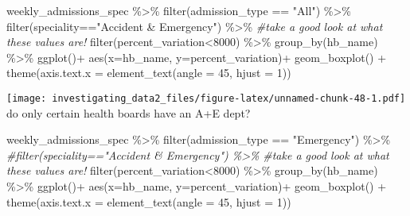 \documentclass[
]{article}
\newenvironment{Shaded}{\begin{snugshade}}{\end{snugshade}}
\newcommand{\AttributeTok}[1]{\textcolor[rgb]{0.77,0.63,0.00}{#1}}
\newcommand{\CommentTok}[1]{\textcolor[rgb]{0.56,0.35,0.01}{\textit{#1}}}
\newcommand{\DecValTok}[1]{\textcolor[rgb]{0.00,0.00,0.81}{#1}}
\newcommand{\FunctionTok}[1]{\textcolor[rgb]{0.00,0.00,0.00}{#1}}
\newcommand{\NormalTok}[1]{#1}
\newcommand{\SpecialCharTok}[1]{\textcolor[rgb]{0.00,0.00,0.00}{#1}}
\newcommand{\StringTok}[1]{\textcolor[rgb]{0.31,0.60,0.02}{#1}}
\begin{document}
\begin{Shaded}
\begin{Highlighting}[]
\NormalTok{weekly\_admissions\_spec }\SpecialCharTok{\%\textgreater{}\%} 
  \FunctionTok{filter}\NormalTok{(admission\_type }\SpecialCharTok{==} \StringTok{"All"}\NormalTok{) }\SpecialCharTok{\%\textgreater{}\%} 
  \FunctionTok{filter}\NormalTok{(speciality}\SpecialCharTok{==}\StringTok{"Accident \& Emergency"}\NormalTok{) }\SpecialCharTok{\%\textgreater{}\%} 
  \CommentTok{\#take a good look at what these values are!}
  \FunctionTok{filter}\NormalTok{(percent\_variation}\SpecialCharTok{\textless{}}\DecValTok{8000}\NormalTok{) }\SpecialCharTok{\%\textgreater{}\%} 
  \FunctionTok{group\_by}\NormalTok{(hb\_name) }\SpecialCharTok{\%\textgreater{}\%} 
  \FunctionTok{ggplot}\NormalTok{()}\SpecialCharTok{+}
  \FunctionTok{aes}\NormalTok{(}\AttributeTok{x=}\NormalTok{hb\_name, }\AttributeTok{y=}\NormalTok{percent\_variation)}\SpecialCharTok{+}
  \FunctionTok{geom\_boxplot}\NormalTok{() }\SpecialCharTok{+}
  \FunctionTok{theme}\NormalTok{(}\AttributeTok{axis.text.x =} \FunctionTok{element\_text}\NormalTok{(}\AttributeTok{angle =} \DecValTok{45}\NormalTok{, }\AttributeTok{hjust =} \DecValTok{1}\NormalTok{))}
\end{Highlighting}
\end{Shaded}

\texttt{[image: investigating\_data2\_files/figure-latex/unnamed-chunk-48-1.pdf]}
do only certain health boards have an A+E dept?

\begin{Shaded}
\begin{Highlighting}[]
\NormalTok{weekly\_admissions\_spec }\SpecialCharTok{\%\textgreater{}\%} 
  \FunctionTok{filter}\NormalTok{(admission\_type }\SpecialCharTok{==} \StringTok{"Emergency"}\NormalTok{) }\SpecialCharTok{\%\textgreater{}\%} 
  \CommentTok{\#filter(speciality=="Accident \& Emergency") \%\textgreater{}\% }
  \CommentTok{\#take a good look at what these values are!}
  \FunctionTok{filter}\NormalTok{(percent\_variation}\SpecialCharTok{\textless{}}\DecValTok{8000}\NormalTok{) }\SpecialCharTok{\%\textgreater{}\%} 
  \FunctionTok{group\_by}\NormalTok{(hb\_name) }\SpecialCharTok{\%\textgreater{}\%} 
  \FunctionTok{ggplot}\NormalTok{()}\SpecialCharTok{+}
  \FunctionTok{aes}\NormalTok{(}\AttributeTok{x=}\NormalTok{hb\_name, }\AttributeTok{y=}\NormalTok{percent\_variation)}\SpecialCharTok{+}
  \FunctionTok{geom\_boxplot}\NormalTok{() }\SpecialCharTok{+}
  \FunctionTok{theme}\NormalTok{(}\AttributeTok{axis.text.x =} \FunctionTok{element\_text}\NormalTok{(}\AttributeTok{angle =} \DecValTok{45}\NormalTok{, }\AttributeTok{hjust =} \DecValTok{1}\NormalTok{))}
\end{Highlighting}
\end{Shaded}
\end{document}
